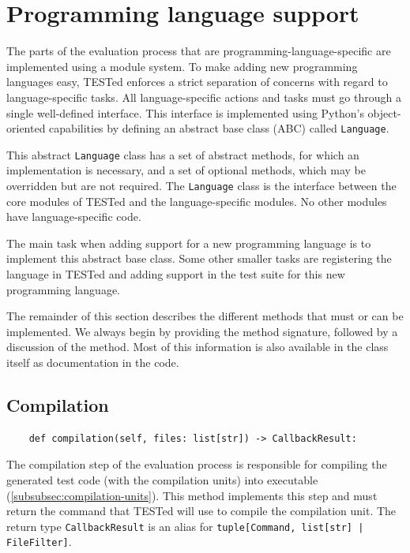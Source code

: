 \documentclass[../main]{subfiles}
\begin{document}
\section{Programming language support}\label{sec:programming-language-support}

The parts of the evaluation process that are programming-language-specific are implemented using a module system.
To make adding new programming languages easy, TESTed enforces a strict separation of concerns with regard to language-specific tasks.
All language-specific actions and tasks must go through a single well-defined interface.
This interface is implemented using Python's object-oriented capabilities by defining an abstract base class (ABC) called \texttt{Language}.

This abstract \texttt{Language} class has a set of abstract methods, for which an implementation is necessary, and a set of optional methods, which may be overridden but are not required.
The \texttt{Language} class is the interface between the core modules of TESTed and the language-specific modules.
No other modules have language-specific code.

The main task when adding support for a new programming language is to implement this abstract base class.
Some other smaller tasks are registering the language in TESTed and adding support in the test suite for this new programming language.

The remainder of this section describes the different methods that must or can be implemented.
We always begin by providing the method signature, followed by a discussion of the method.
Most of this information is also available in the class itself as documentation in the code.

\subsection{Compilation}\label{subsec:impl-compilation}

\begin{verbatim}
    def compilation(self, files: list[str]) -> CallbackResult:
\end{verbatim}

The compilation step of the evaluation process is responsible for compiling the generated test code (with the compilation units) into executable (\cref{subsubsec:compilation-units}).
This method implements this step and must return the command that TESTed will use to compile the compilation unit.
The return type \texttt{CallbackResult} is an alias for \texttt{tuple[Command, list[str] | FileFilter]}.
\end{document}

